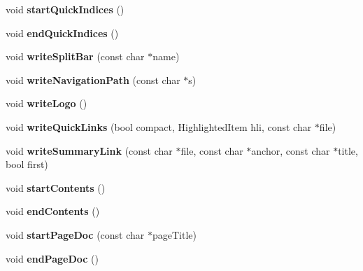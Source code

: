 \begin{DoxyCompactItemize}
void {\bfseries start\+Quick\+Indices} ()
\item 
\mbox{\label{class_html_generator_a72052df688b371d1b3fe83ec95273e78}} 
void {\bfseries end\+Quick\+Indices} ()
\item 
\mbox{\label{class_html_generator_a9856409be5e34cb9f7461e9c6076b8e9}} 
void {\bfseries write\+Split\+Bar} (const char $\ast$name)
\item 
\mbox{\label{class_html_generator_aea25a87c7877cf9a4bb04c4e63debacf}} 
void {\bfseries write\+Navigation\+Path} (const char $\ast$s)
\item 
\mbox{\label{class_html_generator_a6f2d8ea4be1a4586c32c8217d7716422}} 
void {\bfseries write\+Logo} ()
\item 
\mbox{\label{class_html_generator_aa4c36c4fe46af1be803d39f7b1d95a41}} 
void {\bfseries write\+Quick\+Links} (bool compact, Highlighted\+Item hli, const char $\ast$file)
\item 
\mbox{\label{class_html_generator_aea30e4c7f7f5ff602bdbee818d1f06cc}} 
void {\bfseries write\+Summary\+Link} (const char $\ast$file, const char $\ast$anchor, const char $\ast$title, bool first)
\item 
\mbox{\label{class_html_generator_a54eaa6e2b9fe8f3aee9eff264da2449e}} 
void {\bfseries start\+Contents} ()
\item 
\mbox{\label{class_html_generator_ada62c0664d53d3e22fffae0503a860f2}} 
void {\bfseries end\+Contents} ()
\item 
\mbox{\label{class_html_generator_add913ed083be344a99b74f35088771c3}} 
void {\bfseries start\+Page\+Doc} (const char $\ast$page\+Title)
\item 
\mbox{\label{class_html_generator_aea57ed1a242d65a2a5f5f37bca387194}} 
void {\bfseries end\+Page\+Doc} ()
\item 
\mbox{\label{class_html_generator_aca7f1402f6cc3d9efbe9815ab8de3cc5}} 

\end{DoxyCompactItemize}
